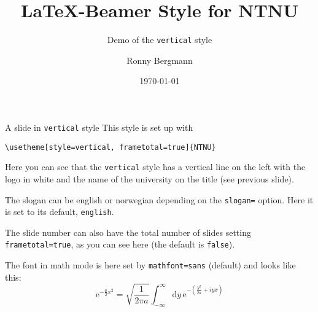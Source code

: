\documentclass[aspectratio=169]{beamer}
\title{\LaTeX{}-Beamer Style for NTNU}
\subtitle{Demo of the  \texttt{vertical} style}
\author{Ronny Bergmann}
\date{\today}
\begin{document}
	\maketitle
		\begin{frame}[fragile]{A slide in \texttt{vertical} style}
			This style is set up with

			\lstinline!\usetheme[style=vertical, frametotal=true]{NTNU}!

			Here you can see that the \texttt{vertical} style has a vertical line on the left with the logo in white and the name of the university on the title (see previous slide).

			The slogan can be english or norwegian depending on the \lstinline!slogan=! option. Here it is set to its default, \lstinline!english!.

			The slide number can also have the total number of slides setting \lstinline!frametotal=true!,
            as you can see here (the default is \lstinline!false!).
            
            The font in math mode is here set by \lstinline!mathfont=sans! (default) and looks like this: \[\mathrm{e}^{-\frac{a}{2}x^2} = \sqrt{\frac{1}{2\pi a}} \int_{-\infty}^\infty\mathrm{d}y\, \mathrm{e}^{-\left(\frac{y^2}{2a} +iy x\right)}\]
		\end{frame}
\end{document}

